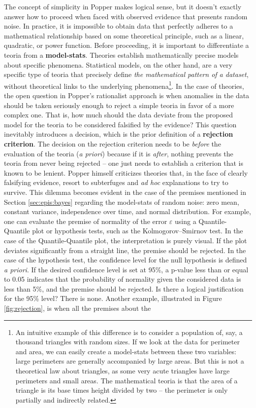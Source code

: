 \documentclass[./main_en.tex]{subfiles}
\begin{document}
\par The concept of simplicity in Popper makes logical sense, but it doesn't exactly answer how to proceed when faced with observed evidence that presents random noise. In practice, it is impossible to obtain data that perfectly adheres to a mathematical relationship based on some theoretical principle, such as a linear, quadratic, or power function. Before proceeding, it is important to differentiate a \gls{teoria} from a \textbf{\gls{model-stats}}. Theories establish mathematically precise models about specific phenomena. Statistical models, on the other hand, are a very specific type of \gls{teoria} that precisely define \textit{the mathematical pattern of a dataset}, without theoretical links to the underlying phenomena\footnote{An intuitive example of this difference is to consider a population of, say, a thousand triangles with random sizes. If we look at the data for perimeter and area, we can easily create a \gls{model-stats} between these two variables: large perimeters are generally accompanied by large areas. But this is not a theoretical law about triangles, as some very acute triangles have large perimeters and small areas. The mathematical \gls{teoria} is that the area of a triangle is its base times height divided by two -- the perimeter is only partially and indirectly related.}. In the case of theories, the open question in Popper's rationalist approach is when anomalies in the data should be taken seriously enough to reject a simple \gls{teoria} in favor of a more complex one. That is, how much should the data deviate from the proposed \gls{model} for the \gls{teoria} to be considered falsified by the evidence? This question inevitably introduces a decision, which is the prior definition of a \textbf{rejection criterion}. The decision on the rejection criterion needs to be \textit{before} the evaluation of the \gls{teoria} (\textit{a priori}) because if it is \textit{after}, nothing prevents the \gls{teoria} from never being rejected -- one just needs to establish a criterion that is known to be lenient. Popper himself criticizes theories that, in the face of clearly falsifying evidence, resort to subterfuges and \textit{ad hoc} explanations to try to survive. This dilemma becomes evident in the case of the premises mentioned in Section \ref{sec:epis:bayes} regarding the \gls{model-stats} of random noise: zero mean, constant variance, independence over time, and normal distribution. For example, one can evaluate the premise of normality of the error $\varepsilon$ using a Quantile-Quantile plot or hypothesis tests, such as the Kolmogorov–Smirnov test. In the case of the Quantile-Quantile plot, the interpretation is purely visual. If the plot deviates significantly from a straight line, the premise should be rejected. In the case of the hypothesis test, the confidence level for the null hypothesis is defined \textit{a priori}. If the desired confidence level is set at 95\%, a p-value less than or equal to 0.05 indicates that the probability of normality given the considered data is less than 5\%, and the premise should be rejected. Is there a logical justification for the 95\% level? There is none. Another example, illustrated in Figure \ref{fig:rejection}, is when all the premises about the 
\end{document}
